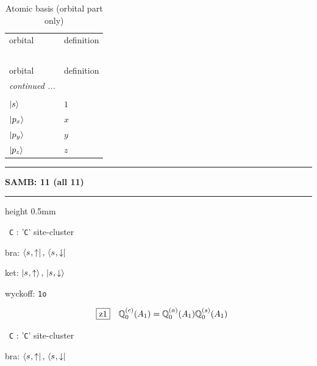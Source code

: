 \documentclass[fleqn,10pt,landscape]{jsarticle}
\begin{document}
\begin{longtable}[l]{ll}
\captionsetup{justification=raggedright, singlelinecheck=off}
\caption{Atomic basis (orbital part only)}
 \\
 \hline \hline
orbital & definition \\ \hline \endfirsthead

\multicolumn{1}{l}{\tablename\ \thetable{}} \\
 \hline \hline
orbital & definition \\ \hline \endhead

 \hline \hline
\multicolumn{1}{r}{\footnotesize\it continued ...} \\ \endfoot

 \hline \hline
\multicolumn{1}{r}{} \\ \endlastfoot

$ \ket{s} $ & $ 1 $ \\ \hline
$ \ket{p_{x}} $ & $ x $ \\
$ \ket{p_{y}} $ & $ y $ \\
$ \ket{p_{z}} $ & $ z $ \\
\end{longtable}
\vspace{5mm}
\noindent \rule[0.5mm]{5mm}{0.5mm}\hspace{3mm}\textbf{SAMB: 11 (all 11)}\hspace{3mm}\leaders\hrule height 0.5mm\hfill\kern0pt
\vspace{3mm}

\vspace{5mm}

\noindent\textbullet\, \texttt{C} : '\texttt{C}' site-cluster

\noindent\quad * bra: $\bra{s_{},\uparrow},\, \bra{s_{},\downarrow}$

\noindent\quad * ket: $\ket{s_{},\uparrow},\, \ket{s_{},\downarrow}$

\noindent\quad * wyckoff: \texttt{1o}

\begin{dmath*}
\hspace*{3mm}\fbox{z1}\quad \mathbb{Q}_{0}^{(c)}(A_{1})=\mathbb{Q}_{0}^{(a)}(A_{1}) \mathbb{Q}_{0}^{(s)}(A_{1})
\end{dmath*}
\vspace{5mm}

\noindent\textbullet\, \texttt{C} : '\texttt{C}' site-cluster

\noindent\quad * bra: $\bra{s_{},\uparrow},\, \bra{s_{},\downarrow}$
\end{document}
